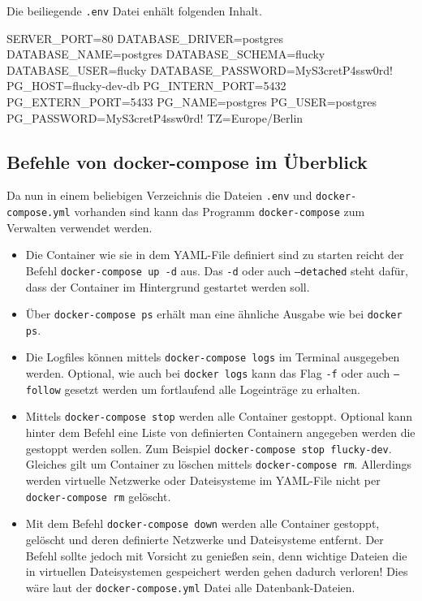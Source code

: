 Die beiliegende \texttt{.env} Datei enhält folgenden Inhalt.

\begin{bashcode}
  SERVER_PORT=80
  DATABASE_DRIVER=postgres
  DATABASE_NAME=postgres
  DATABASE_SCHEMA=flucky
  DATABASE_USER=flucky
  DATABASE_PASSWORD=MyS3cretP4ssw0rd!
  PG_HOST=flucky-dev-db
  PG_INTERN_PORT=5432
  PG_EXTERN_PORT=5433
  PG_NAME=postgres
  PG_USER=postgres
  PG_PASSWORD=MyS3cretP4ssw0rd!
  TZ=Europe/Berlin
\end{bashcode}

\subsection{Befehle von docker-compose im Überblick}%
\label{sec:docker-compose.befehle}
Da nun in einem beliebigen Verzeichnis die Dateien \texttt{.env} und \texttt{docker-compose.yml} vorhanden sind kann das Programm \texttt{docker-compose} zum Verwalten verwendet werden.

\begin{itemize}[itemsep=0pt]
  \item Die Container wie sie in dem YAML-File definiert sind zu starten reicht der Befehl \texttt{docker-compose up -d} aus. Das \texttt{-d} oder auch \texttt{--detached} steht dafür, dass der Container im Hintergrund gestartet werden soll.
  \item Über \texttt{docker-compose ps} erhält man eine ähnliche Ausgabe wie bei \texttt{docker ps}.
  \item Die Logfiles können mittels \texttt{docker-compose logs} im Terminal ausgegeben werden. Optional, wie auch bei \texttt{docker logs} kann das Flag \texttt{-f} oder auch \texttt{--follow} gesetzt werden um fortlaufend alle Logeinträge zu erhalten.
  \item Mittels \texttt{docker-compose stop} werden alle Container gestoppt. Optional kann hinter dem Befehl eine Liste von definierten Containern angegeben werden die gestoppt werden sollen. Zum Beispiel \texttt{docker-compose stop flucky-dev}. Gleiches gilt um Container zu löschen mittels \texttt{docker-compose rm}. Allerdings werden virtuelle Netzwerke oder Dateisysteme im YAML-File nicht per \texttt{docker-compose rm} gelöscht.
  \item Mit dem Befehl \texttt{docker-compose down} werden alle Container gestoppt, gelöscht und deren definierte Netzwerke und Dateisysteme entfernt. Der Befehl sollte jedoch mit Vorsicht zu genießen sein, denn wichtige Dateien die in virtuellen Dateisystemen gespeichert werden gehen dadurch verloren! Dies wäre laut der \texttt{docker-compose.yml} Datei alle Datenbank-Dateien.
\end{itemize}

